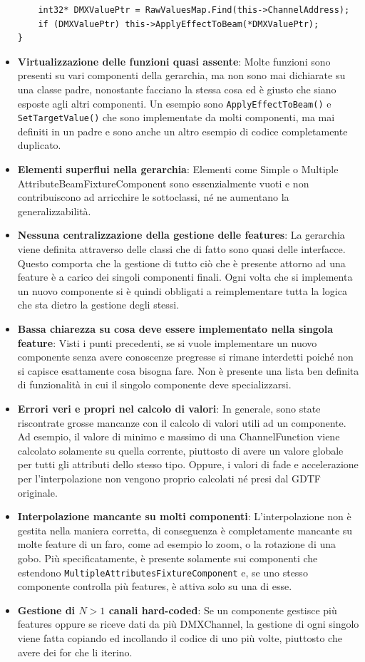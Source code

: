 \documentclass[main.tex]{subfiles}
\begin{document}
\begin{itemize}
\begin{lstlisting}
	int32* DMXValuePtr = RawValuesMap.Find(this->ChannelAddress);
	if (DMXValuePtr) this->ApplyEffectToBeam(*DMXValuePtr);
}
\end{lstlisting}
    \item \textbf{Virtualizzazione delle funzioni quasi assente}: Molte funzioni sono presenti su vari componenti della gerarchia, ma non sono mai dichiarate su una classe padre, nonostante facciano la stessa cosa ed è giusto che siano esposte agli altri componenti. Un esempio sono \lstinline{ApplyEffectToBeam()} e \lstinline{SetTargetValue()} che sono implementate da molti componenti, ma mai definiti in un padre e sono anche un altro esempio di codice completamente duplicato.
    \item \textbf{Elementi superflui nella gerarchia}: Elementi come Simple o Multiple AttributeBeamFixtureComponent sono essenzialmente vuoti e non contribuiscono ad arricchire le sottoclassi, né ne aumentano la generalizzabilità.
    \item \textbf{Nessuna centralizzazione della gestione delle features}: La gerarchia viene definita attraverso delle classi che di fatto sono quasi delle interfacce. Questo comporta che la gestione di tutto ciò che è presente attorno ad una feature è a carico dei singoli componenti finali. Ogni volta che si implementa un nuovo componente si è quindi obbligati a reimplementare tutta la logica che sta dietro la gestione degli stessi.
    \item \textbf{Bassa chiarezza su cosa deve essere implementato nella singola feature}: Visti i punti precedenti, se si vuole implementare un nuovo componente senza avere conoscenze pregresse si rimane interdetti poiché non si capisce esattamente cosa bisogna fare. Non è presente una lista ben definita di funzionalità in cui il singolo componente deve specializzarsi.
    \item \textbf{Errori veri e propri nel calcolo di valori}: In generale, sono state riscontrate grosse mancanze con il calcolo di valori utili ad un componente. Ad esempio, il valore di minimo e massimo di una ChannelFunction viene calcolato solamente su quella corrente, piuttosto di avere un valore globale per tutti gli attributi dello stesso tipo. Oppure, i valori di fade e accelerazione per l'interpolazione non vengono proprio calcolati né presi dal GDTF originale.
    \item \textbf{Interpolazione mancante su molti componenti}: L'interpolazione non è gestita nella maniera corretta, di conseguenza è completamente mancante su molte feature di un faro, come ad esempio lo zoom, o la rotazione di una gobo. Più specificatamente, è presente solamente sui componenti che estendono \lstinline{MultipleAttributesFixtureComponent} e, se uno stesso componente controlla più features, è attiva solo su una di esse.
    \item \textbf{Gestione di $N > 1$ canali hard-coded}: Se un componente gestisce più features oppure se riceve dati da più DMXChannel, la gestione di ogni singolo viene fatta copiando ed incollando il codice di uno più volte, piuttosto che avere dei for che li iterino.
\end{itemize}
\end{document}
